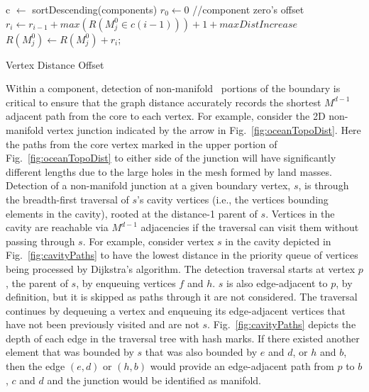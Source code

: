 \begin{algorithm}
  \begin{algorithmic}[1]
  \State c $\leftarrow$ sortDescending(components)
  \State $r_0 \leftarrow 0$   //component zero's offset
     \State $r_i \leftarrow r_{i-1} + max(R(M^0_j \in c(i-1))) + 1 + maxDistIncrease$
  \EndFor
        \State $R(M^0_j) \leftarrow R(M^0_j) + r_i$;
      \EndIf
    \EndFor
  \EndFor
  \caption{Vertex Distance Offset}
  \label{alg:distOff}
  \end{algorithmic}
\end{algorithm}

Within a component, detection of non-manifold~\cite{weiler1988radial}
portions of the boundary is critical to ensure that the graph distance
accurately records the shortest $M^{d-1}$ adjacent path from the core to each
vertex.
For example, consider the 2D non-manifold vertex junction
indicated by the arrow in Fig.~\ref{fig:oceanTopoDist}.
Here the paths from the core vertex marked in the upper portion of
Fig.~\ref{fig:oceanTopoDist} to either side of the
junction will have significantly different lengths due to the large holes in the
mesh formed by land masses.
Detection of a non-manifold junction at a given boundary vertex, $s$, is through
the breadth-first traversal of $s$'s cavity vertices (i.e., the vertices bounding 
elements in the cavity), rooted at the distance-1 parent of $s$.
Vertices in the cavity are reachable via $M^{d-1}$ adjacencies if the traversal
can visit them without passing through $s$.
For example, consider vertex $s$ in the cavity depicted in Fig.~\ref{fig:cavityPaths} to
have the lowest distance in the priority queue of vertices being processed by
Dijkstra's algorithm.
The detection traversal starts at vertex $p$, the parent of $s$, by enqueuing
vertices $f$ and $h$.
$s$ is also edge-adjacent to $p$, by definition, but it is skipped as paths
through it are not considered.
The traversal continues by dequeuing a vertex and enqueuing its edge-adjacent
vertices that have not been previously visited and are not $s$.
Fig.~\ref{fig:cavityPaths} depicts the depth of each edge in the traversal
tree with hash marks.
If there existed another element that was bounded by $s$ that was also bounded
by $e$ and $d$, or $h$ and $b$, then the edge $(e,d)$ or $(h,b)$ would provide an
edge-adjacent path from $p$ to $b$, $c$ and $d$ and the junction would be
identified as manifold.

